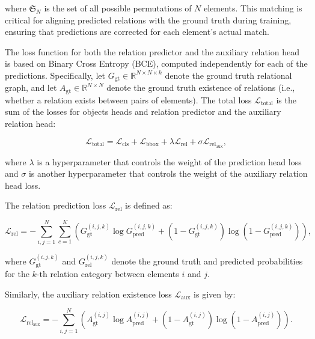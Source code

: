 where \( \mathfrak{S}_N \) is the set of all possible permutations of \( N \) elements. This matching is critical for aligning predicted relations with the ground truth during training, ensuring that predictions are corrected for each element's actual match.

The loss function for both the relation predictor and the auxiliary relation head is based on Binary Cross Entropy (BCE), computed independently for each of the predictions. Specifically, let $ G_{\text{gt}} \in \mathbb{R}^{N \times N \times k} $ denote the ground truth relational graph, and let $ A_{\text{gt}} \in \mathbb{R}^{N \times N} $ denote the ground truth existence of relations (i.e., whether a relation exists between pairs of elements). The total loss $ \mathcal{L}_{\text{total}} $ is the sum of the losses for objects heads and relation predictor and the auxiliary relation head:

\begin{equation}
\mathcal{L}_{\text{total}} = \mathcal{L}_{\text{cls}} + \mathcal{L}_{\text{bbox}} + \lambda \mathcal{L}_{\text{rel}} + \sigma \mathcal{L}_{\text{rel}_\text{aux}},
\end{equation}

where $ \lambda $ is a hyperparameter that controls the weight of the prediction head loss and $\sigma$ is another hyperparameter that controls the weight of the auxiliary relation head loss.

The relation prediction loss $ \mathcal{L}_{\text{rel}} $ is defined as:

\begin{equation}
\mathcal{L}_{\text{rel}} = - \sum_{i,j=1}^{N} \sum_{c=1}^{K} \left( G_{\text{gt}}^{(i,j,k)} \log G_{\text{pred}}^{(i,j,k)} + (1 - G_{\text{gt}}^{(i,j,k)}) \log (1 - G_{\text{pred}}^{(i,j,k)}) \right),
\end{equation}


where $ G_{\text{gt}}^{(i,j,k)} $ and $ G_{\text{rel}}^{(i,j,k)} $ denote the ground truth and predicted probabilities for the $ k $-th relation category between elements $ i $ and $ j $.

Similarly, the auxiliary relation existence loss $ \mathcal{L}_{\text{aux}} $ is given by:

\begin{equation}
\mathcal{L}_{\text{rel}_\text{aux}} = - \sum_{i,j=1}^{N} \left( A_{\text{gt}}^{(i,j)} \log A_{\text{pred}}^{(i,j)} + (1 - A_{\text{gt}}^{(i,j)}) \log (1 - A_{\text{pred}}^{(i,j)}) \right).
\end{equation}


